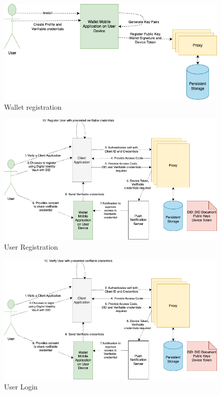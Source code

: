     \begin{figure}
        
        \includegraphics[width=15cm]{images/WalletRegistration.drawio.png}
        \centering
        \caption{Wallet registration}
        \label{fig:my_label}
    \end{figure}
    \begin{figure}
        
        \includegraphics[width=15cm]{images/User Registration.drawio.png}
        \centering
        \caption{User Registration}
        \label{fig:my_label}
    \end{figure}
    \begin{figure}
        
        \includegraphics[width=15cm]{images/UserWalletClientAppLogin.drawio.png}
        \centering
        \caption{User Login}
        \label{fig:my_label}
    \end{figure}
